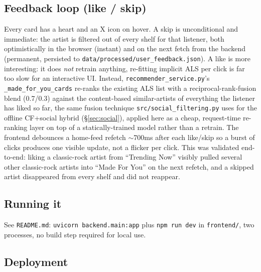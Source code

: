 \documentclass[11pt,a4paper]{article}
\newcommand{\code}[1]{\texttt{#1}}
\newcommand{\secref}[1]{\S\ref{#1}}
\begin{document}
\subsection{Feedback loop (like / skip)}

Every card has a heart and an X icon on hover. A skip is unconditional and immediate: the artist is filtered out of every shelf for that listener, both optimistically in the browser (instant) and on the next fetch from the backend (permanent, persisted to \code{data/processed/user\_feedback.json}). A like is more interesting: it does \emph{not} retrain anything, re-fitting implicit ALS per click is far too slow for an interactive UI. Instead, \code{recommender\_service.py}'s \code{\_made\_for\_you\_cards} re-ranks the existing ALS list with a reciprocal-rank-fusion blend (0.7/0.3) against the content-based similar-artists of everything the listener has liked so far, the same fusion technique \code{src/social\_filtering.py} uses for the offline CF+social hybrid (\secref{sec:social}), applied here as a cheap, request-time re-ranking layer on top of a statically-trained model rather than a retrain. The frontend debounces a home-feed refetch $\sim$700ms after each like/skip so a burst of clicks produces one visible update, not a flicker per click. This was validated end-to-end: liking a classic-rock artist from ``Trending Now'' visibly pulled several other classic-rock artists into ``Made For You'' on the next refetch, and a skipped artist disappeared from every shelf and did not reappear.

\subsection{Running it}

See \code{README.md}: \code{uvicorn backend.main:app} plus \code{npm run dev} in \code{frontend/}, two processes, no build step required for local use.

\subsection{Deployment}
\end{document}
